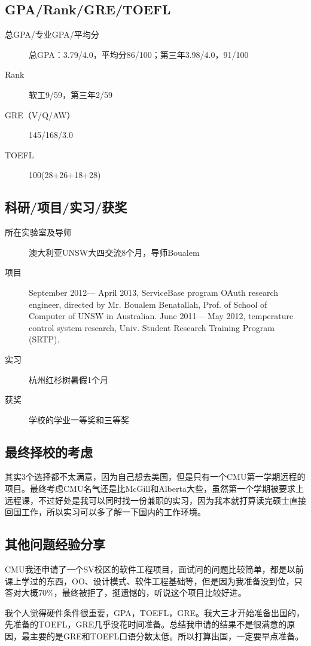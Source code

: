 \documentclass[11pt,fleqn,openany]{book} %
\begin{document}
\subsection*{GPA/Rank/GRE/TOEFL}
\begin{description}
\item[总GPA/专业GPA/平均分] 总GPA：3.79/4.0，平均分86/100；第三年3.98/4.0，91/100
\item[Rank] 软工9/59，第三年2/59
\item[GRE（V/Q/AW）] 145/168/3.0
\item[TOEFL] 100(28+26+18+28)
\end{description}

\subsection*{科研/项目/实习/获奖}
\begin{description}
\item[所在实验室及导师] 澳大利亚UNSW大四交流8个月，导师Boualem
\item[项目] September 2012— April 2013, ServiceBase program OAuth research engineer, directed by Mr. Boualem Benatallah, Prof. of School of Computer of UNSW in Australian.
June 2011— May 2012, temperature control system research, Univ. Student Research Training Program (SRTP).
\item[实习] 杭州红杉树暑假1个月
\item[获奖] 学校的学业一等奖和三等奖
\end{description}
\subsection*{最终择校的考虑}
其实3个选择都不太满意，因为自己想去美国，但是只有一个CMU第一学期远程的项目。最终考虑CMU名气还是比McGill和Alberta大些，虽然第一个学期被要求上远程课，不过好处是我可以同时找一份兼职的实习，因为我本就打算读完硕士直接回国工作，所以实习可以多了解一下国内的工作环境。
\subsection*{其他问题经验分享}
CMU我还申请了一个SV校区的软件工程项目，面试问的问题比较简单，都是以前课上学过的东西，OO、设计模式、软件工程基础等，但是因为我准备没到位，只答对大概70\%，最终被拒了，挺遗憾的，听说这个项目比较好进。

我个人觉得硬件条件很重要，GPA，TOEFL，GRE。我大三才开始准备出国的，先准备的TOEFL，GRE几乎没花时间准备。总结我申请的结果不是很满意的原因，最主要的是GRE和TOEFL口语分数太低。所以打算出国，一定要早点准备。
\clearpage
\end{document}
